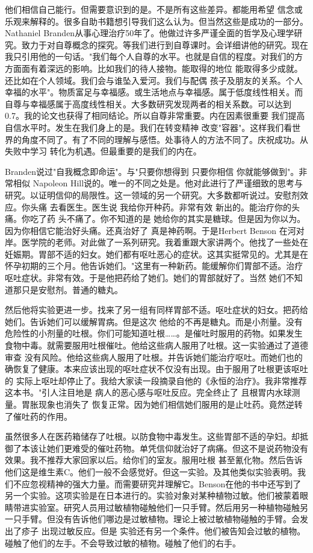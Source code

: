 他们相信自己能行。但需要意识到的是。不是所有这些差异。都能用希望 信念或乐观来解释的。很多自助书籍想引导我们这么认为。但当然这些是成功的一部分。Nathaniel Branden从事心理治疗50年了。他做过许多严谨全面的哲学及心理学研究。致力于对自尊概念的探究。等我们进行到自尊课时。会详细讲他的研究。现在我只引用他的一句话。"我们每个人自尊的水平。也就是自信的程度。对我们的方方面面有着深远的影响。比如我们的待人接物。能取得的地位 能取得多少成就。还比如在个人领域。我们会与谁坠入爱河。我们与配偶 孩子及朋友的关系。个人幸福的水平"。物质富足与幸福感。或生活地点与幸福感。属于低度线性相关。而自尊与幸福感属于高度线性相关。大多数研究发现两者的相关系数。可以达到0.7。我的论文也获得了相同结论。所以自尊非常重要。内在因素很重要 我们提高自信水平时。发生在我们身上的是。我们在转变精神 改变"容器"。这样我们看世界的角度不同了。有了不同的理解与感悟。处事待人的方法不同了。庆祝成功。从失败中学习 转化为机遇。但最重要的是我们的内在。 

Branden说过"自我概念即命运"。与"只要你想得到 只要你相信 你就能够做到"。非常相似 Napoleon Hill说的。唯一的不同之处是。他对此进行了严谨细致的思考与研究。以证明信仰的局限性。这一领域的另一个研究。大多数都听说过。安慰剂效应。你头痛 去看医生。医生说 我给你开种药。非常有效 新出的。能治疗你的头痛。你吃了药 头不痛了。你不知道的是 她给你的其实是糖球。但是因为你以为。因为你相信它能治好头痛。还真治好了 真是神药啊。于是Herbert Benson 在河对岸。医学院的老师。对此做了一系列研究。我着重跟大家讲两个。他找了一些处在妊娠期。胃部不适的妇女。她们都有呕吐恶心的症状。这其实挺常见的。尤其是在怀孕初期的三个月。他告诉她们。"这里有一种新药。能缓解你们胃部不适。治疗呕吐症状。非常有效。于是他把药给了她们。她们的胃部就好了。当然 她们不知道那只是安慰剂。普通的糖丸。 

然后他将实验更进一步。找来了另一组有同样胃部不适。呕吐症状的妇女。把药给她们。告诉她们可以缓解胃病。但是这次 他给的不再是糖丸。而是小剂量。没有危险性的小剂量的吐根。你们可能知道吐根……。是催吐时服用的药物。如果发生食物中毒。就需要服用吐根催吐。他给这些病人服用了吐根。这一实验通过了道德审查 没有风险。他给这些病人服用了吐根。并告诉她们能治疗呕吐。而她们也的确恢复了健康。本来应该出现的呕吐症状不仅没有出现。由于服用了吐根更该呕吐的 实际上呕吐却停止了。我给大家读一段摘录自他的《永恒的治疗》。我非常推荐这本书。"引人注目地是 病人的恶心感与呕吐反应。完全终止了 且根胃内水球测量。胃胀现象也消失了 恢复正常。因为她们相信她们服用的是止吐药。竟然逆转了催吐药的作用。 

虽然很多人在医药箱储存了吐根。以防食物中毒发生。这些胃部不适的孕妇。却抵御了本该让她们更难受的催吐药物。单凭信仰就治好了病痛。但这不是说药物没有效果。我不推荐大家回家以后。给你们的室友。服用吐根 甚至氰化物。然后告诉他们这是维生素C。他们一般不会感觉好。但这一实验。及其他类似实验表明。我们不应忽视精神的强大力量。而需要研究并理解它。Benson在他的书中还写到了另一个实验。这项实验是在日本进行的。实验对象对某种植物过敏。他们被蒙着眼睛带进实验室。研究人员用过敏植物碰触他们一只手臂。然后用另一种植物碰触另一只手臂。但没有告诉他们哪边是过敏植物。理论上被过敏植物碰触的手臂。会发出了疹子 出现过敏反应。但是 实验还有另一个条件。他们被告知会过敏的植物。碰触了他们的左手。不会导致过敏的植物。碰触了他们的右手。 

